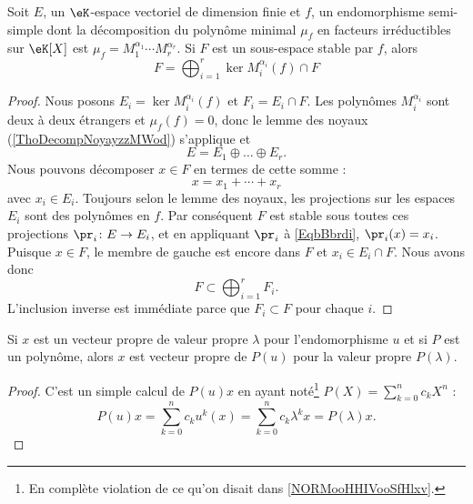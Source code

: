 \begin{corollary}   \label{CorKiSCkC}
    Soit \( E\), un \( \eK\)-espace vectoriel de dimension finie et \( f\), un endomorphisme semi-simple dont la décomposition du polynôme minimal \( \mu_f\) en facteurs irréductibles sur \( \eK[X]\) est \( \mu_f=M_1^{\alpha_1}\cdots M_r^{\alpha_r}\). Si \( F\) est un sous-espace stable par \( f\), alors
    \begin{equation}
        F=\bigoplus_{i=1}^r\ker M_i^{\alpha_i}(f)\cap F
    \end{equation}
\end{corollary}

\begin{proof}
    Nous posons \( E_i=\ker M_i^{\alpha_i}(f)\) et \( F_i=E_i\cap F\). Les polynômes \( M_i^{\alpha_i}\) sont deux à deux étrangers et \( \mu_f(f)=0\), donc le lemme des noyaux (\ref{ThoDecompNoyayzzMWod}) s'applique et
    \begin{equation}
        E=E_1\oplus\ldots\oplus E_r.
    \end{equation}
    Nous pouvons décomposer \( x\in F\) en termes de cette somme :
    \begin{equation}     \label{EqbBbrdi}
        x=x_1+\cdots +x_r
    \end{equation}
    avec \( x_i\in E_i\). Toujours selon le lemme des noyaux, les projections sur les espaces \( E_i\) sont des polynômes en \( f\). Par conséquent \( F\) est stable sous toutes ces projections \( \pr_i\colon E\to E_i\), et en appliquant \( \pr_i\) à \eqref{EqbBbrdi}, \( \pr_i(x)=x_i\). Puisque \( x\in F\), le membre de gauche est encore dans \( F\) et \( x_i\in E_i\cap F\). Nous avons donc
    \begin{equation}
        F\subset\bigoplus_{i=1}^rF_i.
    \end{equation}
    L'inclusion inverse est immédiate parce que \( F_i\subset F\) pour chaque \( i\).
\end{proof}

\begin{lemma}   \label{LemVISooHxMdbr}
    Si \( x\) est un vecteur propre de valeur propre \( \lambda\) pour l'endomorphisme \( u\) et si \( P\) est un polynôme, alors \( x\) est vecteur propre de \( P(u)\) pour la valeur propre \( P(\lambda)\).
\end{lemma}

\begin{proof}
    C'est un simple calcul de \( P(u)x\) en ayant noté\footnote{En complète violation de ce qu'on disait dans \ref{NORMooHHIVooSfHlxv}.} \( P(X)=\sum_{k=0}^nc_kX^n\) :
    \begin{equation}
        P(u)x=\sum_{k=0}^nc_ku^k(x)=\sum_{k=0}^nc_k\lambda^kx=P(\lambda)x.
    \end{equation}
\end{proof}

